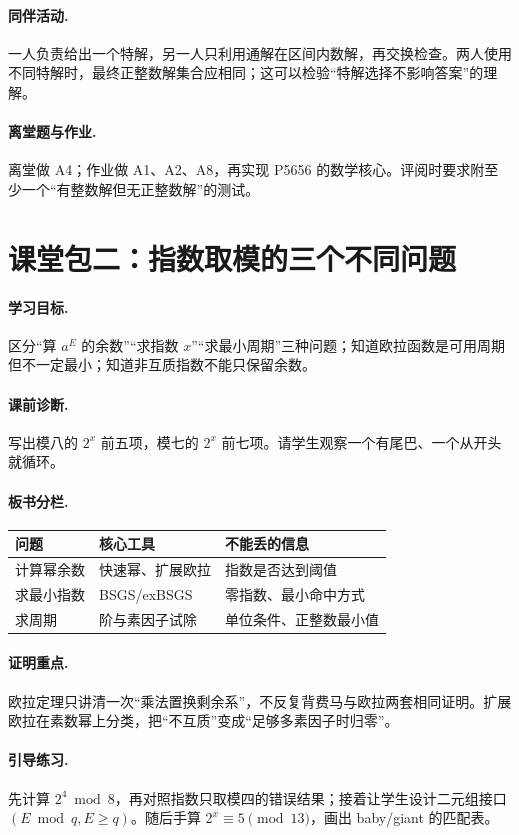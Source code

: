 \documentclass[UTF8,a4paper,11pt,twoside,openright,fontset=fandol]{ctexbook}
\theoremstyle{definition}
\begin{document}
\paragraph{同伴活动.} 一人负责给出一个特解，另一人只利用通解在区间内数解，再交换检查。两人使用不同特解时，最终正整数解集合应相同；这可以检验“特解选择不影响答案”的理解。
\paragraph{离堂题与作业.} 离堂做 A4；作业做 A1、A2、A8，再实现 P5656 的数学核心。评阅时要求附至少一个“有整数解但无正整数解”的测试。

\section{课堂包二：指数取模的三个不同问题}
\paragraph{学习目标.} 区分“算 $a^E$ 的余数”“求指数 $x$”“求最小周期”三种问题；知道欧拉函数是可用周期但不一定最小；知道非互质指数不能只保留余数。
\paragraph{课前诊断.} 写出模八的 $2^x$ 前五项，模七的 $2^x$ 前七项。请学生观察一个有尾巴、一个从开头就循环。
\paragraph{板书分栏.}
\begin{center}
\begin{tabular}{lll}
\toprule
问题 & 核心工具 & 不能丢的信息\\\midrule
计算幂余数 & 快速幂、扩展欧拉 & 指数是否达到阈值\\
求最小指数 & BSGS/exBSGS & 零指数、最小命中方式\\
求周期 & 阶与素因子试除 & 单位条件、正整数最小值\\\bottomrule
\end{tabular}
\end{center}
\paragraph{证明重点.} 欧拉定理只讲清一次“乘法置换剩余系”，不反复背费马与欧拉两套相同证明。扩展欧拉在素数幂上分类，把“不互质”变成“足够多素因子时归零”。
\paragraph{引导练习.} 先计算 $2^4\bmod8$，再对照指数只取模四的错误结果；接着让学生设计二元组接口 $(E\bmod q,E\ge q)$。随后手算 $2^x\equiv5\pmod{13}$，画出 baby/giant 的匹配表。
\end{document}
